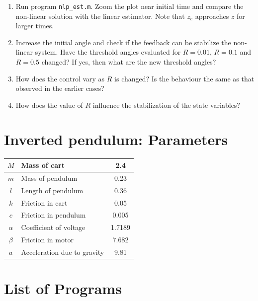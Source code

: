\documentclass[12pt]{article}
\begin{document}
\begin{enumerate}

\item Run program {\tt nlp\_est.m}. Zoom the plot near initial time and compare the non-linear solution with the linear estimator. Note that $z_e$ approaches $z$ for larger times.

\item Increase the initial angle and check if the feedback can be stabilize the non-linear system. Have the threshold angles evaluated for $R=0.01$, $R=0.1$ and $R=0.5$ changed? If yes, then what are the new threshold angles?

\item How does the control vary as $R$ is changed? Is the behaviour the same as that observed in the earlier cases?

\item How does the value of $R$ influence the stabilization of the state variables?

\end{enumerate}


\section{Inverted pendulum: Parameters}

\begin{center}
\begin{tabular}{|c|l|c|}
\hline
$M$ & Mass of cart &  2.4  \\
\hline
$m$ & Mass of pendulum &  0.23 \\
\hline
$l$ & Length of pendulum & 0.36 \\
\hline
$k$ & Friction in cart & 0.05 \\
\hline
$c$ & Friction in pendulum & 0.005 \\
\hline
$\alpha$ & Coefficient of voltage & 1.7189 \\
\hline
$\beta$ &  Friction in motor &  7.682 \\
\hline
$a$ & Acceleration due to gravity & 9.81 \\
\hline
\end{tabular}
\end{center}

\section{List of Programs}
\end{document}
